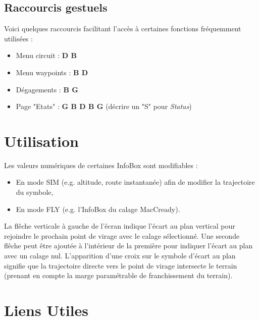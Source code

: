 \documentclass{article}
\begin{document}
\subsection{Raccourcis gestuels}
\noindent
%
Voici quelques raccourcis facilitant l'accès à certaines fonctions fréquemment utilisées :
\begin{itemize}
\item Menu circuit : \textbf{D B}
\item Menu waypoints : \textbf{B D}
\item Dégagements : \textbf{B G}
\item Page "Etats" : \textbf{G B D B G} (décrire un "S" pour \textit{Status})
\end{itemize}
%
\section{Utilisation}
\noindent
Les valeurs numériques de certaines InfoBox sont modifiables :
\begin{itemize}
\item  En mode SIM (e.g. altitude, route instantanée) afin de modifier la trajectoire du symbole,
\item En mode FLY (e.g. l'InfoBox du calage MacCready).
\end{itemize}
\noindent
\newline
La flêche verticale à gauche de l'écran indique l'écart au plan vertical pour rejoindre le prochain point de virage avec le calage sélectionné. Une seconde flêche peut être ajoutée à l'intérieur de la première pour indiquer l'écart au plan avec un calage nul. L'apparition d'une croix sur le symbole d'écart au plan signifie que la trajectoire directe vers le point de virage intersecte le terrain (prenant en compte la marge paramétrable de franchissement du terrain).\\
\section{Liens Utiles}
\noindent
\label{LiensUtiles}
\end{document}
